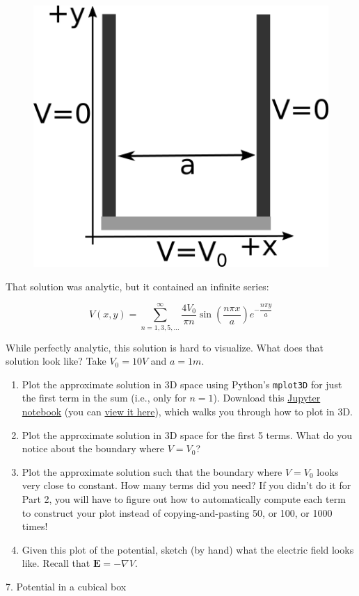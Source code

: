 \documentclass[11pt]{article}
\def\tightlist{}
\begin{document}
\begin{figure}[htbp]
\centering
\includegraphics[width=0.5\linewidth]{./images/hw5/channel.png}
\end{figure}

That solution was analytic, but it contained an infinite series:

\[V(x,y) = \sum_{n=1,3,5,\dots}^{\infty} \dfrac{4 V_0}{\pi n} \sin \left(\dfrac{n\pi x}{a}\right)e^{-\dfrac{n\pi y}{a}}\]

While perfectly analytic, this solution is hard to visualize. What does
that solution look like? Take \(V_0 = 10V\) and \(a = 1m\).

\begin{enumerate}
\def\labelenumi{\arabic{enumi}.}
\tightlist
\item
  Plot the approximate solution in 3D space using Python's
  \texttt{mplot3D} for just the first term in the sum (i.e., only for
  \(n = 1\)). Download this
  \href{../jupyter/HW5-3dPotentialPlot.ipynb}{Jupyter notebook} (you can
  \href{https://github.com/dannycab/phy481msu/blob/gh-pages/jupyter/HW5-3dPotentialPlot.ipynb}{view
  it here}), which walks you through how to plot in 3D.
\item
  Plot the approximate solution in 3D space for the first 5 terms. What
  do you notice about the boundary where \(V=V_0\)?
\item
  Plot the approximate solution such that the boundary where \(V=V_0\)
  looks very close to constant. How many terms did you need? If you
  didn't do it for Part 2, you will have to figure out how to
  automatically compute each term to construct your plot instead of
  copying-and-pasting 50, or 100, or 1000 times!
\item
  Given this plot of the potential, sketch (by hand) what the electric
  field looks like. Recall that \(\mathbf{E} = -\nabla V\).
\end{enumerate}

{7. Potential in a cubical
box}\label{potential-in-a-cubical-box}
\end{document}
